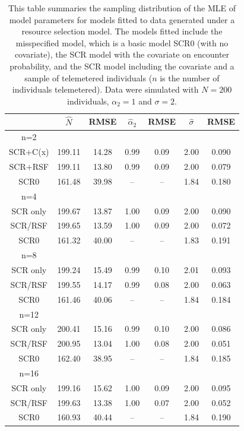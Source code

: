 \begin{table}[ht]
\centering
\caption{
  This table summaries the sampling distribution of the MLE of model
  parameters   for models fitted to data generated under a resource selection model.  The models fitted   include the misspecified model, which is a basic model SCR0 (with no covariate), the SCR model with
  the covariate on encounter probability, and the SCR model including
  the covariate and a sample of telemetered individuals ($n$ is the
  number of individuals telemetered).    Data were simulated with   $N=200$ individuals,
  $\alpha_{2} = 1$ and $\sigma = 2$.
}
\begin{tabular}{ccccccc} \hline \hline 
        &  $\hat{N}$ &RMSE   &  $\hat{\alpha}_{2}$ &RMSE  &        $\hat{\sigma}$ & RMSE    \\ \hline
n=2     &       &       &       &      &        &         \\
SCR+C(x)& 199.11&  14.28&  0.99 &  0.09&   2.00 &  0.090  \\
SCR+RSF & 199.11&  13.80&  0.99 &  0.09&   2.00 &  0.079  \\
SCR0    & 161.48&  39.98&   --  &   -- &   1.84 &  0.180  \\ \hline
n=4   &       &      &        &    &        &          \\
SCR only& 199.67&  13.87&   1.00&   0.09 &  2.00&   0.090 \\
SCR/RSF & 199.65&  13.59&   1.00&   0.09 &  2.00&   0.072\\
SCR0    & 161.32&  40.00&    -- &    --  &  1.83&   0.191\\ \hline
n=8    &       &      &        &    &        &          \\
SCR only& 199.24&  15.49&   0.99&   0.10&   2.01&   0.093 \\
SCR/RSF & 199.55&  14.17&   0.99&   0.08&   2.00&   0.063\\
SCR0    & 161.46&  40.06&    -- &    -- &   1.84&   0.184\\ \hline
n=12    &       &      &        &    &        &          \\
SCR only& 200.41&  15.16&   0.99&   0.10&   2.00&   0.086\\
SCR/RSF & 200.95&  13.04&   1.00&   0.08&   2.00&   0.051\\
SCR0    & 162.40&  38.95&    -- &    -- &   1.84&   0.185\\ \hline
n=16     &       &      &        &    &        &          \\
SCR only &199.16 & 15.62&   1.00 &  0.09&   2.00&   0.095 \\
SCR/RSF  &199.63 & 13.38&   1.00 &  0.07&   2.00&   0.052\\
SCR0     &160.93 & 40.44&    --  &   -- &   1.84&   0.190\\ \hline
\end{tabular}
\label{rsf.tab.sims}
\end{table}
